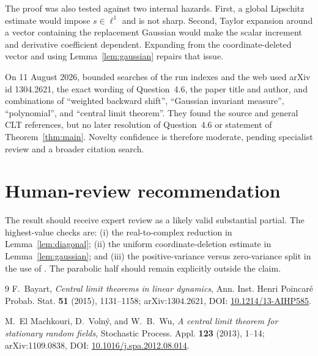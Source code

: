 \documentclass[11pt]{article}
\begin{document}
The proof was also tested against two internal hazards.  First, a global Lipschitz estimate would impose $s\in\ell^1$ and is not sharp.  Second, Taylor expansion around a vector containing the replacement Gaussian would make the scalar increment and derivative coefficient dependent.  Expanding from the coordinate-deleted vector and using Lemma~\ref{lem:gaussian} repairs that issue.

On 11 August 2026, bounded searches of the run indexes and the web used arXiv id 1304.2621, the exact wording of Question~4.6, the paper title and author, and combinations of ``weighted backward shift'', ``Gaussian invariant measure'', ``polynomial'', and ``central limit theorem''.  They found the source and general CLT references, but no later resolution of Question~4.6 or statement of Theorem~\ref{thm:main}.  Novelty confidence is therefore moderate, pending specialist review and a broader citation search.

\section*{Human-review recommendation}

The result should receive expert review as a likely valid substantial partial.  The highest-value checks are: (i) the real-to-complex reduction in Lemma~\ref{lem:diagonal}; (ii) the uniform coordinate-deletion estimate in Lemma~\ref{lem:gaussian}; and (iii) the positive-variance versus zero-variance split in the use of \cite{EMVW}.  The parabolic half should remain explicitly outside the claim.

{\small
\begin{thebibliography}{9}
F.~Bayart,
\emph{Central limit theorems in linear dynamics},
Ann. Inst. Henri Poincar\'e Probab. Stat. \textbf{51} (2015), 1131--1158;
arXiv:1304.2621, DOI: \href{https://doi.org/10.1214/13-AIHP585}{10.1214/13-AIHP585}.

M.~El Machkouri, D.~Voln\'y, and W.~B.~Wu,
\emph{A central limit theorem for stationary random fields},
Stochastic Process. Appl. \textbf{123} (2013), 1--14;
arXiv:1109.0838, DOI: \href{https://doi.org/10.1016/j.spa.2012.08.014}{10.1016/j.spa.2012.08.014}.
\end{thebibliography}
}
\end{document}
